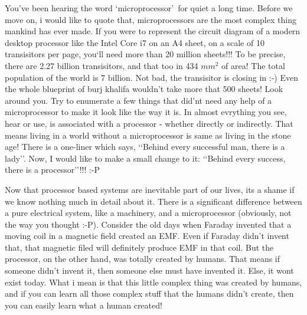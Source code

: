 \documentclass{book}
\begin{document}
You\rq ve been hearing the word \lq microprocessor\rq\ for quiet a long time.
Before we move on, i would like to quote that, microprocessors
are the most complex thing mankind has ever made. If you were to represent the
circuit diagram of a modern desktop processor like the Intel Core i7 on an A4
sheet, on a scale of 10 transisitors per page, you`ll need more than 20 million
sheets!!! To be precise, there are 2.27 billion transisitors, and that too in 434 $mm^2$ of area! The total population of the world is 7 billion. Not bad, the transisitor is closing in :-) Even the whole blueprint of burj khalifa wouldn\rq t take more that
500 sheets! Look around you. Try to enumerate a few things that did\rq nt need
any help of a microprocessor to make it look like the way it is. In almost
evrything you see, hear or use, is associated with a processor - whether
directly or indirectly. That means living in a world without a microprocessor is
same as living in the stone age! There is a one-liner which says, \lq\lq Behind
every successful man, there is a lady\rq\rq. Now, I would like to make a small
change to it: \lq\lq Behind every success, there is a processor\rq\rq!!! :-P

Now that processor based systems are inevitable part of our lives, its a shame
if we know nothing much in detail about it. There is a significant difference
between a pure electrical system, like a machinery, and a microprocessor
(obviously,
not the way you thought :-P). Consider the old days when Faraday invented that a
moving coil in a magnetic field created an EMF. Even if Faraday didn\rq t
invent that, that magnetic filed will definitely produce EMF in that coil. But
the
processor, on the other hand, was totally created by humans. That means if
someone didn\rq t invent it, then someone else must have invented it. Else, it
wont exist today. What i mean is that this little complex thing was created by
humans, and if you can learn all those complex stuff that the humans didn\rq t
create, then you can easily learn what a human created!
\end{document}

